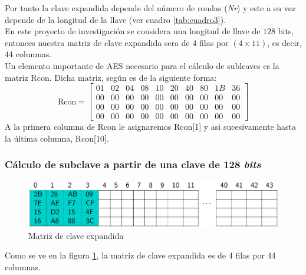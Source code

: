 \documentclass[peerreview]{IEEEtran}
\begin{document}
Por tanto la clave expandida depende del número de rondas (\textit{Nr}) y este a su vez depende de la longitud de la llave (ver cuadro \ref{tab:cuadro3}).\\

En este proyecto de investigación se considera una longitud de llave de $128$ bits, entonces nuestra matriz de clave expandida sera de $4$ filas por $(4\times11)$, es decir, 44 columnas.\\

Un elemento importante de AES necesario para el cálculo de sublcaves es la matriz Rcon.
Dicha matriz, según \cite{NIS01} es de la siguiente forma:
\[
\text{Rcon}= \begin{bmatrix}
	01 & 02 & 04 & 08 & 10 & 20 & 40 & 80 & 1B & 36 \\
	00 & 00 & 00 & 00 & 00 & 00 & 00 & 00 & 00 & 00 \\
	00 & 00 & 00 & 00 & 00 & 00 & 00 & 00 & 00 & 00 \\
	00 & 00 & 00 & 00 & 00 & 00 & 00 & 00 & 00 & 00 
\end{bmatrix}
\] 
A la primera columna de Rcon le asignaremos Rcon[1] y asi sucesivamente hasta la última columna, Rcon[10].

\subsubsection{Cálculo de subclave a partir de una clave de 128 \textit{bits}}
 \begin{figure}[h]
 	\includegraphics[scale=0.38]{figuras/clave_expandida.png}
	\centering
	\caption{Matriz de clave expandida}
	\label{fig:10}
\end{figure}

Como se ve en la figura \ref{fig:10}, la matriz de clave expandida es de 4 filas por 44 columnas.
\end{document}
